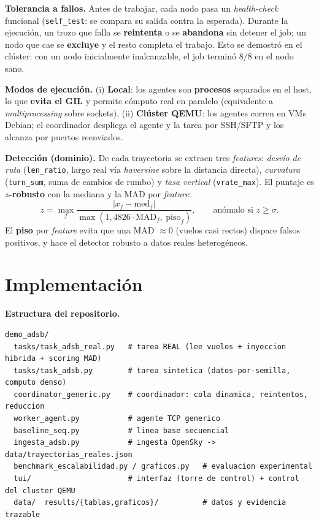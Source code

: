 \documentclass[letterpaper,11pt]{article}
\begin{document}
\textbf{Tolerancia a fallos.} Antes de trabajar, cada nodo pasa un \emph{health-check} funcional
(\texttt{self\_test}: se compara su salida contra la esperada). Durante la ejecución, un trozo que falla
se \textbf{reintenta} o se \textbf{abandona} sin detener el job; un nodo que cae se \textbf{excluye} y el
resto completa el trabajo. Esto se demostró en el clúster: con un nodo inicialmente inalcanzable, el job
terminó $8/8$ en el nodo sano.

\textbf{Modos de ejecución.} (i) \textbf{Local}: los agentes son \textbf{procesos} separados en el host,
lo que \textbf{evita el GIL} y permite cómputo real en paralelo (equivalente a \emph{multiprocessing}
sobre sockets). (ii) \textbf{Clúster QEMU}: los agentes corren en VMs Debian; el coordinador despliega el
agente y la tarea por SSH/SFTP y los alcanza por puertos reenviados.

\textbf{Detección (dominio).} De cada trayectoria se extraen tres \emph{features}: \emph{desvío de ruta}
(\texttt{len\_ratio}, largo real vía \emph{haversine} sobre la distancia directa), \emph{curvatura}
(\texttt{turn\_sum}, suma de cambios de rumbo) y \emph{tasa vertical} (\texttt{vrate\_max}). El puntaje es
\textbf{$z$-robusto} con la mediana y la MAD por \emph{feature}:
\[
z = \max_f \frac{|x_f - \text{med}_f|}{\max(1{,}4826\cdot \text{MAD}_f,\ \text{piso}_f)},
\qquad \text{anómalo si } z \ge \sigma .
\]
El \textbf{piso} por \emph{feature} evita que una MAD $\approx 0$ (vuelos casi rectos) dispare falsos
positivos, y hace el detector robusto a datos reales heterogéneos.

\section{Implementación}
\textbf{Estructura del repositorio.}
\begin{lstlisting}
demo_adsb/
  tasks/task_adsb_real.py   # tarea REAL (lee vuelos + inyeccion hibrida + scoring MAD)
  tasks/task_adsb.py        # tarea sintetica (datos-por-semilla, computo denso)
  coordinator_generic.py    # coordinador: cola dinamica, reintentos, reduccion
  worker_agent.py           # agente TCP generico
  baseline_seq.py           # linea base secuencial
  ingesta_adsb.py           # ingesta OpenSky -> data/trayectorias_reales.json
  benchmark_escalabilidad.py / graficos.py   # evaluacion experimental
  tui/                      # interfaz (torre de control) + control del cluster QEMU
  data/  results/{tablas,graficos}/          # datos y evidencia trazable
\end{lstlisting}
\end{document}
